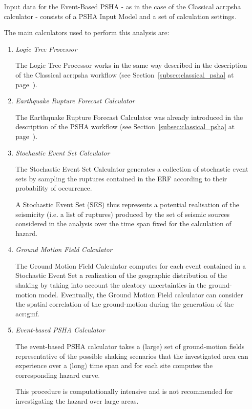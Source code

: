 Input data for the Event-Based PSHA - as in the case of the Classical
\gls{acr:psha} calculator - consists of a PSHA Input Model and a set of
calculation settings.

The main calculators used to perform this analysis are:

\begin{enumerate}

	\item \emph{Logic Tree Processor}

	The Logic Tree Processor works in the same way described in  the
	description of the Classical \gls{acr:psha} workflow  (see
	Section~\ref{subsec:classical_psha} at
	page~\pageref{subsec:classical_psha}).

	\item \emph{Earthquake Rupture Forecast Calculator}

	The Earthquake Rupture Forecast Calculator was already  introduced in the
	description of the PSHA workflow (see Section~\ref{subsec:classical_psha}
	at page~\pageref{subsec:classical_psha}).

	\item \emph{Stochastic Event Set Calculator}

	The Stochastic Event Set Calculator generates a collection of stochastic
	event sets by sampling the ruptures contained in the ERF according to
	their probability of occurrence.

	A Stochastic Event Set (SES) thus represents a potential realisation of
	the seismicity (i.e. a list of ruptures) produced by the set of seismic
	sources considered in the analysis over the time span fixed for the
	calculation of hazard.

	\item \emph{Ground Motion Field Calculator}

	The Ground Motion Field Calculator computes for each event contained in a
	Stochastic Event Set a realization of the geographic distribution of the
	shaking by taking into account the aleatory uncertainties in the ground-
	motion model. Eventually, the Ground Motion Field calculator can consider
	the spatial correlation of the ground-motion during the generation of the
	\gls{acr:gmf}.

	\item \emph{Event-based PSHA Calculator}

	The event-based PSHA calculator takes a (large) set of ground-motion
	fields representative of the possible shaking scenarios that the
	investigated area can experience over a (long) time span and for each
	site computes the corresponding hazard curve.

	This procedure is computationally intensive and is not recommended for
	investigating the hazard over large areas.

\end{enumerate}